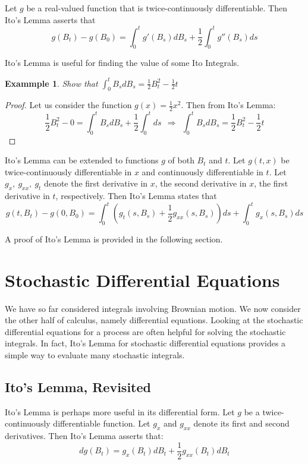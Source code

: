\documentclass{article}
\newtheorem{example}[theorem]{Exammple}
\begin{document}
Let $g$ be a real-valued function that is twice-continuously differentiable.  Then Ito's Lemma asserts that 
$$g(B_t) - g(B_0) = \int_0^t g'(B_s)dB_s + \frac12 \int_0^t g''(B_s)ds$$

Ito's Lemma is useful for finding the value of some Ito Integrals.  

\begin{example}
Show that $\int_0^t B_s dB_s = \frac12 B_t^2 - \frac12 t$
\end{example}
\begin{proof}
Let us consider the function $g(x) = \frac12 x^2$.  Then from Ito's Lemma: 
$$\frac12 B_t^2 - 0 = \int_0^t B_sdB_s + \frac12 \int_0^t ds \ \ \Rightarrow \ \ \int_0^t B_sdB_s = \frac12 B_t^2 - \frac12 t$$

\end{proof}

Ito's Lemma can be extended to functions $g$ of both $B_t$ and $t$.  Let $g(t,x)$ be twice-continuously differentiable in $x$ and continuously differentiable in $t$.  Let $g_x,\ g_{xx},\ g_t$ denote the first derivative in $x$, the second derivative in $x$, the first derivative in $t$, respectively.  Then Ito's Lemma states that 
$$g(t,B_t) - g(0,B_0) = \int_0^t \left(g_t(s, B_s) + \frac12 g_{xx}(s, B_s)\right)ds + \int_0^t g_x(s, B_s)ds$$

A proof of Ito's Lemma is provided in the following section.





\section{Stochastic Differential Equations}
We have so far considered integrals involving Brownian motion.  We now consider the other half of calculus, namely differential equations.  Looking at the stochastic differential equations for a process are often helpful for solving the stochastic integrals.  In fact, Ito's Lemma for stochastic differential equations provides a simple way to evaluate many stochastic integrals.

\subsection{Ito's Lemma, Revisited}
Ito's Lemma is perhaps more useful in its differential form.  Let $g$ be a twice-continuously differentiable function.  Let $g_x$ and $g_{xx}$ denote its first and second derivatives.  Then Ito's Lemma asserts that:
$$dg(B_t) = g_x(B_t)dB_t + \frac12 g_{xx}(B_t)dB_t$$
\end{document}
